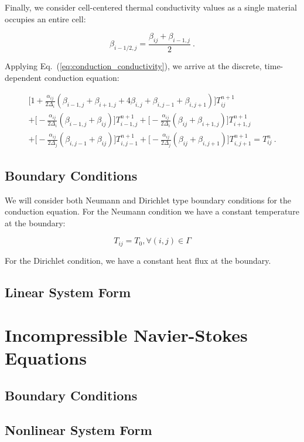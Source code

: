 \documentclass[letterpaper,12pt]{article}
\begin{document}
Finally, we consider cell-centered thermal conductivity values as a
single material occupies an entire cell:

\begin{equation}
  \beta_{i-1/2,j} = \frac{\beta_{ij}+\beta_{i-1,j}}{2}\:.
  \label{eq:conduction_conductivity}
\end{equation}

Applying Eq.~(\ref{eq:conduction_conductivity}), we arrive at the discrete,
time-dependent conduction equation:

\begin{multline}
 \Big[1 + \frac{\alpha_{ij}}{2\Delta_i}(\beta_{i-1,j} +
   \beta_{i+1,j} + 4 \beta_{i,j} + \beta_{i,j-1} + \beta_{i,j+1})\Big]
 T^{n+1}_{ij} \\
 + \Big[-\frac{\alpha_{ij}}{2 \Delta_i}
   (\beta_{i-1,j}+\beta_{ij})\Big] T^{n+1}_{i-1,j}
 + \Big[-\frac{\alpha_{ij}}{2 \Delta_i}(\beta_{ij}+\beta_{i+1,j})\Big]
 T^{n+1}_{i+1,j} \\
 + \Big[-\frac{\alpha_{ij}}{2 \Delta_j}
   (\beta_{i,j-1}+\beta_{ij})\Big] T^{n+1}_{i,j-1} +
 \Big[-\frac{\alpha_{ij}}{2 \Delta_j}(\beta_{ij}+\beta_{i,j+1})\Big]
 T^{n+1}_{i,j+1} = T^n_{ij}\:.
 \label{eq:conduction_discrete_equation}
\end{multline}


\subsection{Boundary Conditions}

We will consider both Neumann and Dirichlet type boundary conditions
for the conduction equation. For the Neumann condition we have a
constant temperature at the boundary:

\begin{equation}
  T_{ij} = T_0, \forall (i,j) \in \Gamma
  \label{eq:conduction_neumann}
\end{equation}

For the Dirichlet condition, we have a constant heat flux at the boundary.

\subsection{Linear System Form}

\section{Incompressible Navier-Stokes Equations}

\subsection{Boundary Conditions}

\subsection{Nonlinear System Form}

\pagebreak
 
\end{document}
